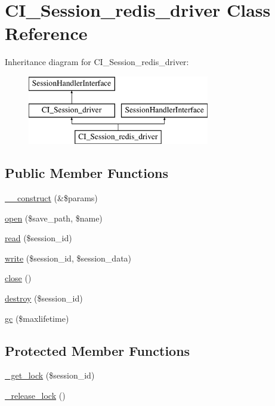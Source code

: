 \hypertarget{class_c_i___session__redis__driver}{}\section{C\+I\+\_\+\+Session\+\_\+redis\+\_\+driver Class Reference}
\label{class_c_i___session__redis__driver}
Inheritance diagram for C\+I\+\_\+\+Session\+\_\+redis\+\_\+driver\+:\begin{figure}[H]
\begin{center}
\leavevmode
\includegraphics[height=3.000000cm]{class_c_i___session__redis__driver}
\end{center}
\end{figure}
\subsection*{Public Member Functions}
\begin{DoxyCompactItemize}
\item 
\hyperlink{class_c_i___session__redis__driver_ac1669c73d53d6f16cf5459a1e84d39c8}{\+\_\+\+\_\+construct} (\&\$params)
\item 
\hyperlink{class_c_i___session__redis__driver_a614b5cf3840833913c7a73260ed28e02}{open} (\$save\+\_\+path, \$name)
\item 
\hyperlink{class_c_i___session__redis__driver_a5bbf84ebf657be4eaccc0582377c76bf}{read} (\$session\+\_\+id)
\item 
\hyperlink{class_c_i___session__redis__driver_ad9d124885be93668f1dbf6aace5964f5}{write} (\$session\+\_\+id, \$session\+\_\+data)
\item 
\hyperlink{class_c_i___session__redis__driver_aa69c8bf1f1dcf4e72552efff1fe3e87e}{close} ()
\item 
\hyperlink{class_c_i___session__redis__driver_aaec5812f6b4eb6835f88d3baa06a002a}{destroy} (\$session\+\_\+id)
\item 
\hyperlink{class_c_i___session__redis__driver_a57aff7ee0656d8aa75d545fb8b3ae35d}{gc} (\$maxlifetime)
\end{DoxyCompactItemize}
\subsection*{Protected Member Functions}
\begin{DoxyCompactItemize}
\item 
\hyperlink{class_c_i___session__redis__driver_a2c49c8e23be3e2aca96a9d20de18ffc2}{\+\_\+get\+\_\+lock} (\$session\+\_\+id)
\item 
\hyperlink{class_c_i___session__redis__driver_a0265e356e6cf1eaba229663c1664c37d}{\+\_\+release\+\_\+lock} ()
\end{DoxyCompactItemize}
